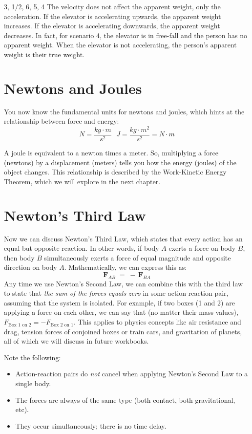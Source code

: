 \begin{Answer}[ref = elevator]
3, 1/2, 6, 5, 4
The velocity does not affect the apparent weight, only the acceleration. If the 
elevator is accelerating upwards, the apparent weight increases. If the elevator 
is accelerating downwards, the apparent weight decreases. In fact, for scenario 
4, the elevator is in free-fall and the person has no apparent weight. When the 
elevator is not accelerating, the person's apparent weight is their true weight. 
\end{Answer}


\section{Newtons and Joules}
You now know the fundamental units for newtons and joules, which hints at the 
relationship between force and energy:
$$N = \frac{kg \cdot m}{s^2} \text{     } J = \frac{kg \cdot m^2}{s^2} = N \cdot m$$

A joule is equivalent to a newton times a meter. So, multiplying a force 
(newtons) by a displacement (meters) tells you how the energy (joules) of the 
object changes. This relationship is described by the Work-Kinetic Energy Theorem, 
which we will explore in the next chapter. 

\section{Newton's Third Law}
Now we can discuss Newton's Third Law, which states that every action has an equal but opposite reaction.
In other words, if body \(A\) exerts a force on body \(B\), then body \(B\) simultaneously 
exerts a force of equal magnitude and opposite direction on body \(A\).
Mathematically, we can express this as:
\[
    \mathbf{F}_{\!AB} \;=\; -\,\mathbf{F}_{\!BA}
\]
Any time we use Newton's Second Law, we can combine this with the third law to state that 
\emph{the sum of the forces equals zero} in some action-reaction pair, assuming that the system is isolated. For example, if two boxes (1 and 2) are 
applying a force on each other, we can say that (no matter their mass values), $F_{\text{Box 1 on 2}} = -F_{\text{Box 2 on 1}}$.
This applies to physics concepts like air resistance and drag, tension forces of conjoined boxes or train cars, and gravitation 
of planets, all of which we will discuss in future workbooks.

Note the following:
\begin{itemize}
    \item Action-reaction pairs do \emph{not} cancel when applying Newton's Second Law to a single body.
    \item The forces are always of the same type (both contact, both gravitational, etc).
    \item They occur simultaneously; there is no time delay.
\end{itemize}

